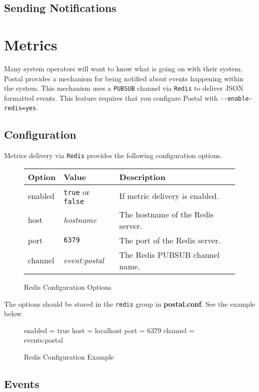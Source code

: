 \documentclass[12pt]{article}
\newcommand{\file}[1]{{\bf\ttfamily #1}}
\begin{document}
\subsection{Sending Notifications}

\section{Metrics}

Many system operators will want to know what is going on with their system.
Postal provides a mechanism for being notified about events happening within the system.
This mechanism uses a \verb|PUBSUB| channel via \verb|Redis| to deliver JSON formatted events.
This feature requires that you configure Postal with \verb|--enable-redis=yes|.

\subsection{Configuration}

Metrics delivery via \verb|Redis| provides the following configuration options.

\begin{figure}[h!]
\centering
\begin{tabular}{l l l}
\hline
Option & Value & Description \\
\hline
enabled & \verb|true| or \verb|false| & If metric delivery is enabled. \\
host & \emph{hostname} & The hostname of the Redis server. \\
port & \verb|6379| & The port of the Redis server. \\
channel & \emph{event:postal} & The Redis PUBSUB channel name. \\
\hline
\end{tabular}
\caption{Redis Configuration Options}
\end{figure}

The options should be stored in the \verb|redis| group in \file{postal.conf}.
See the example below.

\begin{figure}[h!]
\begin{Terminal}
[redis]
enabled = true
host = localhost
port = 6379
channel = events:postal
\end{Terminal}
\caption{Redis Configuration Example}
\end{figure}

\subsection{Events}
\end{document}
